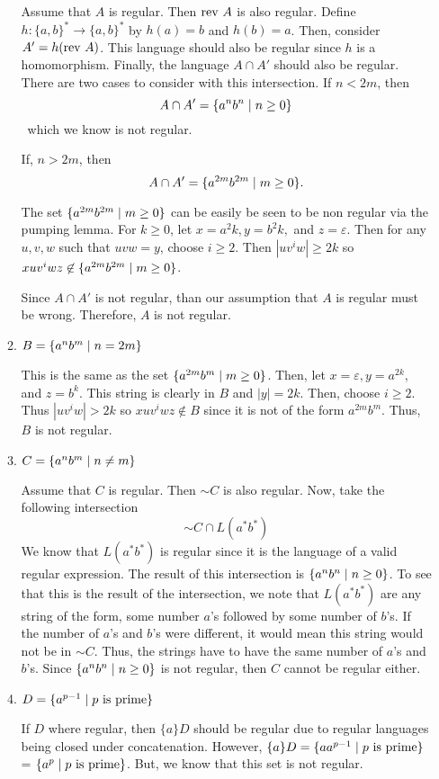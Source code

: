 \documentclass{article}
\newcommand{\func}[3]{#1: #2 \to #3}
\newcommand{\setst}{\hspace{1mm} | \hspace{1mm} }
\newcommand{\rev}{\textnormal{rev }}
\renewcommand{\epsilon}{\varepsilon}
\theoremstyle{definition}
\begin{document}
\begin{enumerate}
\begin{enumerate}
	Assume that $A$ is regular. Then $\rev A$ is also regular. Define $\func{h}{\{a,b\}^*}{\{a,b\}^*}$ by $h(a) = b$ and $h(b) = a$. Then, consider $A' = h(\rev A)$. This language should also be regular since $h$ is a homomorphism. Finally, the language $A \cap A'$ should also be regular. There are two cases to consider with this intersection. If $n < 2m$, then 
	\[A \cap A' = \{a^nb^n \setst n \geq 0\}\]\
	which we know is not regular. 
	
	If, $n > 2m$, then 
	\[A \cap A' = \{a^{2m}b^{2m} \setst m \geq 0\}.\]
	
	The set $\{a^{2m}b^{2m} \setst m \geq 0\}$ can be easily be seen to be non regular via the pumping lemma. For $k \geq 0$, let $x = a^2k, y = b^2k,$ and $z = \epsilon$. Then for any $u,v,w$ such that $uvw = y$, choose $i \geq 2$. Then $|uv^iw| \geq 2k$ so $xuv^iwz \not \in \{a^{2m}b^{2m} \setst m \geq 0\}$. 
	
	Since $A \cap A'$ is not regular, than our assumption that $A$ is regular must be wrong. Therefore, $A$ is not regular. 
	
	\item $B = \{a^nb^m \setst n = 2m\} $
	
	This is the same as the set $\{a^{2m}b^m \setst m \geq 0\}$. Then, let $x = \epsilon, y = a^{2k},$ and $z = b^k$. This string is clearly in $B$ and $|y| = 2k$. Then, choose $i \geq 2$. Thus $|uv^iw| > 2k$ so $xuv^iwz \not\in B$ since it is not of the form $a^{2m}b^{m}$. Thus, $B$ is not regular. 
	\item $C = \{a^nb^m \setst n \neq m\}$
	
	Assume that $C$ is regular. Then $\sim C$ is also regular. Now, take the following intersection
	\[\sim C \cap L(a^*b^*)\]
	We know that $L(a^*b^*)$ is regular since it is the language of a valid regular expression. The result of this intersection is $\{a^nb^n \setst n \geq 0\}$. To see that this is the result of the intersection, we note that $L(a^*b^*)$ are any string of the form, some number $a$'s followed by some number of $b$'s. If the number of $a$'s and $b$'s were different, it would mean this string would not be in $\sim C$. Thus, the strings have to have the same number of $a$'s and $b$'s. Since $\{a^nb^n \setst n \geq 0\}$ is not regular, then $C$ cannot be regular either. 
	\item $D = \{a^{p-1} \setst p \text{ is prime}\}$
	
	If $D$ where regular, then $\{a\}D$ should be regular due to regular languages being closed under concatenation. However, $\{a\}D = \{aa^{p-1} \setst p \text{ is prime}\}$ = $\{a^p \setst  p \text{ is prime}\}$. But, we know that this set is not regular. 
	

\end{enumerate}
\end{enumerate}
\end{document}
